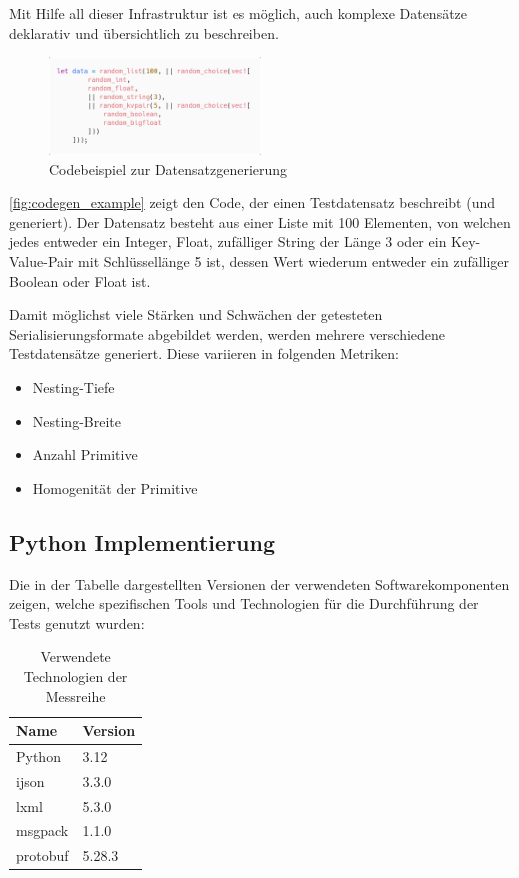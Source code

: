 \documentclass[ngerman]{seminarvorlage}
\begin{document}
Mit Hilfe all dieser Infrastruktur ist es möglich, auch komplexe Datensätze deklarativ und übersichtlich zu beschreiben.

\begin{figure}[h]
    \centering
    \includegraphics[width=0.5\textwidth]{images/codegen_code.png}
    \caption{Codebeispiel zur Datensatzgenerierung}
    \label{fig:codegen_example}
\end{figure}

\autoref{fig:codegen_example} zeigt den Code, der einen Testdatensatz beschreibt (und generiert). Der Datensatz besteht aus einer Liste mit 100 Elementen, von welchen jedes entweder ein Integer, Float, zufälliger String der Länge 3 oder ein Key-Value-Pair mit Schlüssellänge 5 ist, dessen Wert wiederum entweder ein zufälliger Boolean oder Float ist.

Damit möglichst viele Stärken und Schwächen der getesteten Serialisierungsformate abgebildet werden, werden mehrere verschiedene Testdatensätze generiert. Diese variieren in folgenden Metriken:

\begin{itemize}
  \item Nesting-Tiefe
  \item Nesting-Breite
  \item Anzahl Primitive
  \item Homogenität der Primitive
\end{itemize}

\subsection{Python Implementierung}

Die in der Tabelle dargestellten Versionen der verwendeten Softwarekomponenten zeigen, welche spezifischen Tools und Technologien für die Durchführung der Tests genutzt wurden:

\begin{table}[H]
    \centering
    \begin{tabular}{|l|l|}
    \hline
    \textbf{Name} & \textbf{Version} \\ \hline
    Python        & 3.12             \\ \hline
    ijson         & 3.3.0            \\ \hline
    lxml          & 5.3.0            \\ \hline
    msgpack       & 1.1.0            \\ \hline
    protobuf      & 5.28.3           \\ \hline
    \end{tabular}
    \caption{Verwendete Technologien der Messreihe}
\end{table}
\end{document}

